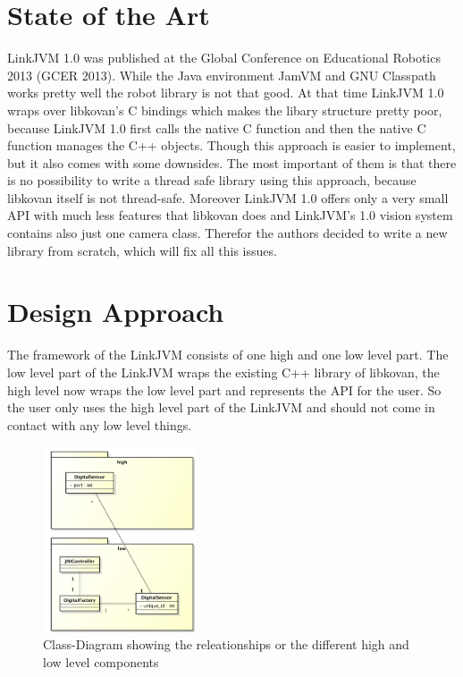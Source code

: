 \documentclass{juniorjournal}
\begin{document}
\section{State of the Art}
LinkJVM 1.0\cite{linkjvm1.0} was published at the Global Conference on Educational Robotics 2013\cite{GCER} (GCER 2013).
While the Java environment JamVM\cite{JamVM} and GNU Classpath\cite{GNU} works pretty well the robot library is not that good.
At that time LinkJVM 1.0 wraps over libkovan's\cite{libkovan} C bindings which makes the libary structure pretty poor, because LinkJVM 1.0 first calls the native C function and then the native C function manages the C++ objects.
Though this approach is easier to implement, but it also comes with some downsides.
The most important of them is that there is no possibility to write a thread safe library using this approach, because libkovan itself is not thread-safe.
Moreover LinkJVM 1.0 offers only a very small API with much less features that libkovan does and LinkJVM's 1.0 vision system contains also just one camera class.
Therefor the authors decided to write a new library from scratch, which will fix all this issues.

\section{Design Approach}
\label{sec:design-approach}
The framework of the LinkJVM consists of one high and one low level part.
The low level part of the LinkJVM wraps the existing C++ library of libkovan,
the high level now wraps the low level part and represents the API for the user.
So the user only uses the high level part of the LinkJVM and should not come in
contact with any low level things.

\begin{figure}[H]
\centering
\includegraphics[width=0.4\textwidth]{images/Class-Diagram.pdf}
\caption{Class-Diagram showing the releationships or the different high and low level components}
\label{fig:Class-Diagram}
\end{figure}
\end{document}
